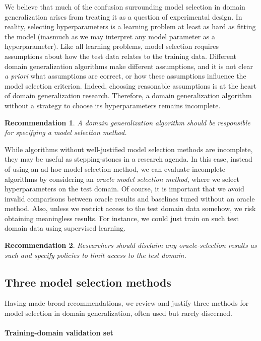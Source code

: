 \documentclass{article}
\newtheorem{recommendation}{Recommendation}
\begin{document}
We believe that much of the confusion surrounding model selection in domain generalization arises from treating it as a question of experimental design.
In reality, selecting hyperparameters is a learning problem at least as hard as fitting the model (inasmuch as we may interpret any model parameter as a hyperparameter).
Like all learning problems, model selection requires assumptions about how the test data relates to the training data.
%
Different domain generalization algorithms make different assumptions, and it is not clear \textit{a priori} what assumptions are correct, or how these assumptions influence the model selection criterion. 
%
Indeed, choosing reasonable assumptions is at the heart of domain generalization research.
%
Therefore, a domain generalization algorithm without a strategy to choose its hyperparameters remains incomplete.

\begin{recommendation}
A domain generalization algorithm should be responsible for specifying a model selection method.
\end{recommendation}

While algorithms without well-justified model selection methods are incomplete, they may be useful as stepping-stones in a research agenda.
In this case, instead of using an ad-hoc model selection method, we can evaluate incomplete algorithms by considering an \emph{oracle model selection method}, where we select hyperparameters on the test domain.
Of course, it is important that we avoid invalid comparisons between oracle results and baselines tuned without an oracle method.
Also, unless we restrict access to the test domain data somehow, we risk obtaining meaningless results.
%
For instance, we could just train on such test domain data using supervised learning.

\begin{recommendation}
Researchers should disclaim any oracle-selection results as such and specify policies to limit access to the test domain.
\end{recommendation}

\subsection{Three model selection methods}

Having made broad recommendations, we review and justify three methods for model selection in domain generalization, often used but rarely discerned.

\paragraph{Training-domain validation set}
\end{document}
